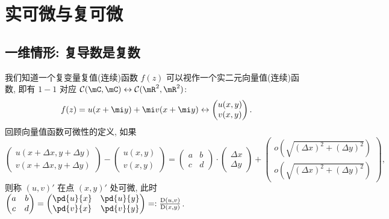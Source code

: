     \section{实可微与复可微}
        \subsection{一维情形: 复导数是复数}
            我们知道一个复变量复值(连续)函数 $f(z)$ 可以视作一个实二元向量值(连续)函数, 即有 $1-1$ 对应 $\mathcal{C}(\mC,\mC)\leftrightarrow\mathcal{C}(\mR^2,\mR^2)$:
            \begin{equation*}
                f(z) = u(x+\mi y)+\mi v(x+\mi y) \leftrightarrow \begin{pmatrix} u(x,y) \\ v(x,y) \end{pmatrix}.
            \end{equation*}
            回顾向量值函数可微性的定义, 如果
            \begin{equation}\label{R-differential}
                \begin{pmatrix}
                    u(x+\Delta x,y+\Delta y) \\ v(x+\Delta x,y+\Delta y)
                \end{pmatrix} - 
                \begin{pmatrix}
                    u(x,y) \\ v(x,y)
                \end{pmatrix} = 
                \begin{pmatrix}
                    a & b \\
                    c & d
                \end{pmatrix}\cdot
                \begin{pmatrix}
                    \Delta x \\ \Delta y 
                \end{pmatrix}+
                \begin{pmatrix}
                    o(\sqrt{(\Delta x)^2+(\Delta y)^2}) \\ o(\sqrt{(\Delta x)^2+(\Delta y)^2})
                \end{pmatrix},
            \end{equation}
            则称 $(u,v)'$ 在点 $(x,y)'$ 处可微, 
            此时 $\begin{pmatrix} a & b \\ c & d \end{pmatrix} = \begin{pmatrix} \pd{u}{x} & \pd{u}{y} \\ \pd{v}{x} & \pd{v}{y} \end{pmatrix}=:\frac{{\rm D}(u,v)}{{\rm D}(x,y)}$.

